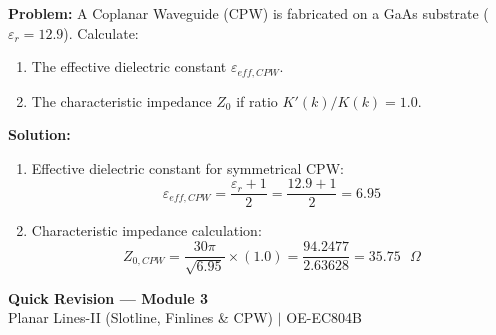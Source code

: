 \documentclass[12pt,a4paper]{article}
\begin{document}
\begin{tcolorbox}[examplebox, title={Worked Numerical: Coplanar Waveguide Impedance Calculation}]
  \textbf{Problem:} A Coplanar Waveguide (CPW) is fabricated on a GaAs substrate ($\varepsilon_r = 12.9$). Calculate:
  \begin{enumerate}[label=(\alph*), noitemsep]
    \item The effective dielectric constant $\varepsilon_{eff,CPW}$.
    \item The characteristic impedance $Z_0$ if ratio $K'(k)/K(k) = 1.0$.
  \end{enumerate}
  \tcblower
  \textbf{Solution:}
  \begin{enumerate}[label=(\alph*), itemsep=4pt]
    \item Effective dielectric constant for symmetrical CPW:
      \begin{equation}
        \varepsilon_{eff,CPW} = \frac{\varepsilon_r + 1}{2} = \frac{12.9 + 1}{2} = 6.95
      \end{equation}
    \item Characteristic impedance calculation:
      \begin{equation}
        Z_{0,CPW} = \frac{30\pi}{\sqrt{6.95}} \times (1.0) = \frac{94.2477}{2.63628} = 35.75\text{ }\Omega
      \end{equation}
  \end{enumerate}
\end{tcolorbox}

\newpage
\begin{center}
  {\large\bfseries\color{myred} Quick Revision --- Module 3}\\[3pt]
  {\small\color{mydark} Planar Lines-II (Slotline, Finlines \& CPW) $|$ OE-EC804B}
\end{center}
\noindent{\color{myred}\rule{\linewidth}{1.2pt}}
\vspace{4pt}
\end{document}
